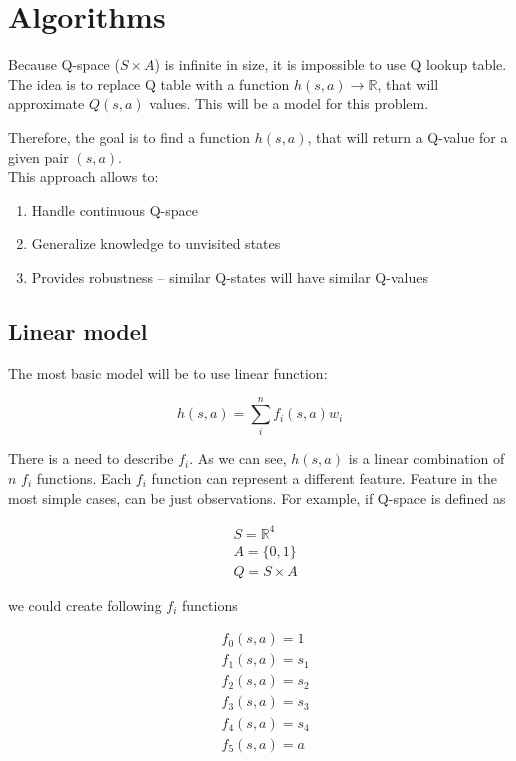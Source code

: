 \documentclass[12pt]{article}
\begin{document}
\section{Algorithms}

Because Q-space ($S \times A$) is infinite in size, it is impossible to use Q lookup table. The idea is to replace Q table with a function $h(s,a) \rightarrow \mathbb{R}$, that will approximate $Q(s, a)$ values. This will be a model for this problem. 

Therefore, the goal is to find a function $h(s, a)$, that will return a Q-value for a given pair  $(s,a)$. 
\\[12pt]
This approach allows to:
\begin{enumerate}
\item Handle continuous Q-space
\item Generalize knowledge to unvisited states
\item Provides robustness – similar Q-states will have similar Q-values
\end{enumerate}

\subsection{Linear model}
The most basic model will be to use linear function:

\begin{equation}
h(s, a) = \sum_i^n f_i(s, a)w_i
\end{equation}

There is a need to describe $f_i$. As we can see, $h(s,a)$ is a linear combination of $n$ $f_i$ functions. Each $f_i$ function can represent a different feature. Feature in the most simple cases, can be just observations. For example, if Q-space is defined as 

\begin{equation}
\begin{aligned}
&S = \mathbb{R}^4 \\
&A = \{0, 1\} \\
&Q = S \times A
\end{aligned}
\end{equation}

we could create following $f_i$ functions

\begin{equation}
\begin{aligned}
&f_0(s, a) = 1 \\
&f_1(s, a) = s_1 \\
&f_2(s, a) = s_2 \\
&f_3(s, a) = s_3 \\
&f_4(s, a) = s_4 \\
&f_5(s, a) = a \\
\end{aligned}
\end{equation}
\end{document}
